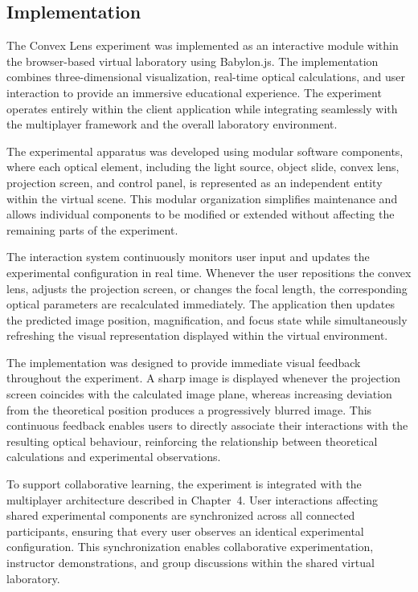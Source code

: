 \subsection{Implementation}

The Convex Lens experiment was implemented as an interactive module within the browser-based virtual laboratory using Babylon.js. The implementation combines three-dimensional visualization, real-time optical calculations, and user interaction to provide an immersive educational experience. The experiment operates entirely within the client application while integrating seamlessly with the multiplayer framework and the overall laboratory environment.

The experimental apparatus was developed using modular software components, where each optical element, including the light source, object slide, convex lens, projection screen, and control panel, is represented as an independent entity within the virtual scene. This modular organization simplifies maintenance and allows individual components to be modified or extended without affecting the remaining parts of the experiment.

The interaction system continuously monitors user input and updates the experimental configuration in real time. Whenever the user repositions the convex lens, adjusts the projection screen, or changes the focal length, the corresponding optical parameters are recalculated immediately. The application then updates the predicted image position, magnification, and focus state while simultaneously refreshing the visual representation displayed within the virtual environment.

The implementation was designed to provide immediate visual feedback throughout the experiment. A sharp image is displayed whenever the projection screen coincides with the calculated image plane, whereas increasing deviation from the theoretical position produces a progressively blurred image. This continuous feedback enables users to directly associate their interactions with the resulting optical behaviour, reinforcing the relationship between theoretical calculations and experimental observations.

To support collaborative learning, the experiment is integrated with the multiplayer architecture described in Chapter~4. User interactions affecting shared experimental components are synchronized across all connected participants, ensuring that every user observes an identical experimental configuration. This synchronization enables collaborative experimentation, instructor demonstrations, and group discussions within the shared virtual laboratory.

